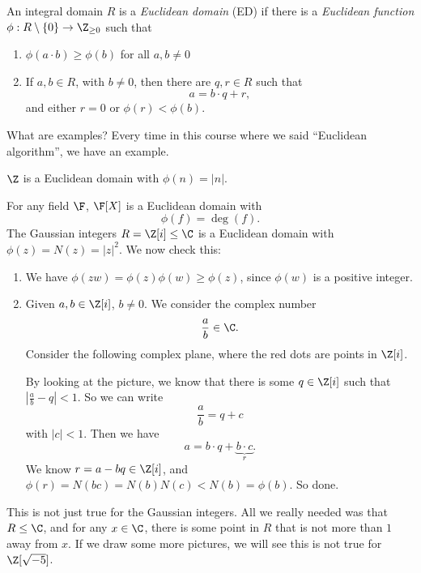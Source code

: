 \documentclass[a4paper]{article}
\begin{document}
\begin{defi}
  An integral domain $R$ is a \emph{Euclidean domain} (ED) if there is a \emph{Euclidean function} $\phi: R\setminus \{0\} \to \Z_{\geq 0}$ such that
  \begin{enumerate}
    \item $\phi(a \cdot b) \geq \phi(b)$ for all $a, b \not= 0$
    \item If $a, b\in R$, with $b \not= 0$, then there are $q, r \in R$ such that
      \[
        a = b \cdot q + r,
      \]
     and either $r = 0$ or $\phi(r) < \phi(b)$.
  \end{enumerate}
\end{defi}

What are examples? Every time in this course where we said ``Euclidean algorithm'', we have an example.
\begin{eg}
  $\Z$ is a Euclidean domain with $\phi(n) = |n|$.

  For any field $\F$, $\F[X]$ is a Euclidean domain with
  \[
    \phi(f) = \deg(f).
  \]
  The Gaussian integers $R = \Z[i] \leq \C$ is a Euclidean domain with $\phi(z) = N(z) = |z|^2$. We now check this:
  \begin{enumerate}
    \item We have $\phi(zw) = \phi(z)\phi(w) \geq \phi(z)$, since $\phi(w)$ is a positive integer.
    \item Given $a, b\in \Z[i]$, $b\not= 0$. We consider the complex number
      \[
        \frac{a}{b} \in \C.
      \]
      Consider the following complex plane, where the red dots are points in $\Z[i]$.
      \begin{center}
      \end{center}
      By looking at the picture, we know that there is some $q \in \Z[i]$ such that $\left|\frac{a}{b} - q\right| < 1$. So we can write
      \[
        \frac{a}{b} = q + c
      \]
      with $|c| < 1$. Then we have
      \[
        a = b\cdot q + \underbrace{b\cdot c}_r.
      \]
      We know $r = a - bq \in \Z[i]$, and $\phi(r) = N(bc) = N(b)N(c) < N(b) = \phi(b)$. So done.
  \end{enumerate}
  This is not just true for the Gaussian integers. All we really needed was that $R \leq \C$, and for any $x \in \C$, there is some point in $R$ that is not more than $1$ away from $x$. If we draw some more pictures, we will see this is not true for $\Z[\sqrt{-5}]$.
\end{eg}
\end{document}
